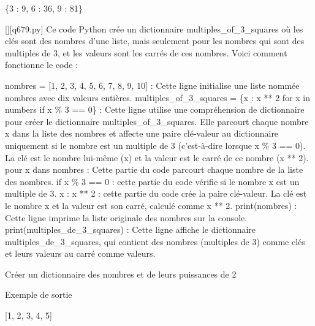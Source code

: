 \{3 : 9, 6 : 36, 9 : 81\}
        \par
        \begin{solution}
            \renewcommand{\nomfichier}{q679.py}
            \pythonfile{\chemincode \nomfichier}[][\nomfichier]
            Ce code Python crée un dictionnaire multiples\_of\_3\_squares où les clés sont des nombres d'une liste, mais seulement pour les nombres qui sont des multiples de 3, et les valeurs sont les carrés de ces nombres. Voici comment fonctionne le code :

    nombres = [1, 2, 3, 4, 5, 6, 7, 8, 9, 10] : Cette ligne initialise une liste nommée nombres avec dix valeurs entières.
    multiples\_of\_3\_squares = \{x : x ** 2 for x in numbers if x \% 3 == 0\} : Cette ligne utilise une compréhension de dictionnaire pour créer le dictionnaire multiples\_of\_3\_squares. Elle parcourt chaque nombre x dans la liste des nombres et affecte une paire clé-valeur au dictionnaire uniquement si le nombre est un multiple de 3 (c'est-à-dire lorsque x \% 3 == 0). La clé est le nombre lui-même (x) et la valeur est le carré de ce nombre (x ** 2).
        pour x dans nombres : Cette partie du code parcourt chaque nombre de la liste des nombres.
        if x \% 3 == 0 : cette partie du code vérifie si le nombre x est un multiple de 3.
        x : x ** 2 : cette partie du code crée la paire clé-valeur. La clé est le nombre x et la valeur est son carré, calculé comme x ** 2.
    print(nombres) : Cette ligne imprime la liste originale des nombres sur la console.
    print(multiples\_de\_3\_squares) : Cette ligne affiche le dictionnaire multiples\_de\_3\_squares, qui contient des nombres (multiples de 3) comme clés et leurs valeurs au carré comme valeurs.
        \end{solution}
        

        \question
        Créer un dictionnaire des nombres et de leurs puissances de 2

Exemple de sortie

[1, 2, 3, 4, 5]

